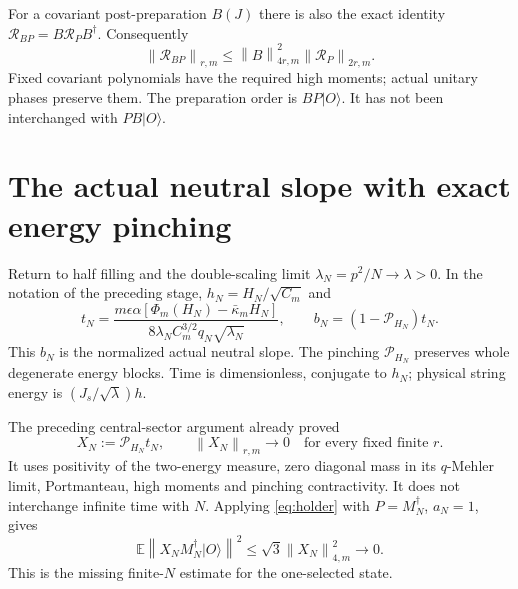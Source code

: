 \documentclass[11pt]{article}
\newcommand{\E}{\mathbb E}
\newcommand{\norm}[1]{\left\lVert#1\right\rVert}
\begin{document}
For a covariant post-preparation $B(J)$ there is also the exact
identity $\mathcal R_{BP}=B\mathcal R_PB^\dagger$. Consequently
\begin{equation}
 \norm{\mathcal R_{BP}}_{r,m}
 \le\norm B_{4r,m}^2\norm{\mathcal R_P}_{2r,m}.
\end{equation}
Fixed covariant polynomials have the required high moments; actual
unitary phases preserve them. The preparation order is $BP|O\rangle$.
It has not been interchanged with $PB|O\rangle$.

\newpage
\section{The actual neutral slope with exact energy pinching}
Return to half filling and the double-scaling limit
$\lambda_N=p^2/N\to\lambda>0$. In the notation of the preceding
stage, $h_N=H_N/\sqrt{C_m}$ and
\begin{equation}
 t_N=\frac{m\epsilon\alpha[\Phi_m(H_N)-\bar\kappa_m H_N]}
 {8\lambda_N C_m^{3/2}q_N\sqrt{\lambda_N}},\qquad
 b_N=(1-\mathcal P_{H_N})t_N.
\end{equation}
This $b_N$ is the normalized actual neutral slope. The pinching
$\mathcal P_{H_N}$ preserves whole degenerate energy blocks.
Time is dimensionless, conjugate to $h_N$; physical string energy
is $(J_s/\sqrt\lambda)h$.

The preceding central-sector argument already proved
\begin{equation}
 X_N:=\mathcal P_{H_N}t_N,
 \qquad \norm{X_N}_{r,m}\longrightarrow0
 \quad\text{for every fixed finite }r.
\end{equation}
It uses positivity of the two-energy measure, zero diagonal mass in
its $q$-Mehler limit, Portmanteau, high moments and pinching
contractivity. It does not interchange infinite time with $N$.
Applying \eqref{eq:holder} with $P=M_N^\dagger$, $a_N=1$, gives
\begin{equation}\label{eq:pinch}
 \E\norm{X_N M_N^\dagger|O\rangle}^2
      \le\sqrt3\norm{X_N}_{4,m}^2\longrightarrow0.
\end{equation}
This is the missing finite-$N$ estimate for the one-selected state.
\end{document}
